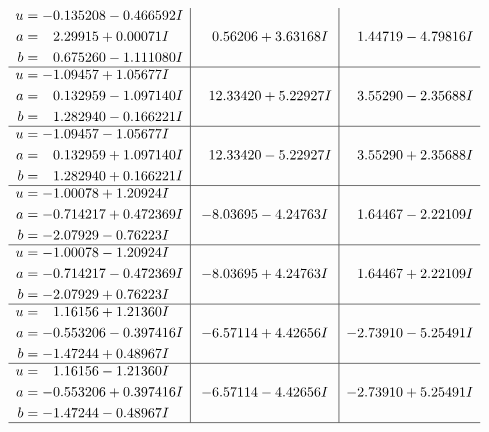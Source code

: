 \documentclass[1p]{elsarticle_modified}
\theoremstyle{definition}
\begin{document}
$$\begin{array}{c|c|c}
\begin{aligned}
u &= -0.135208 - 0.466592 I \\
a &= \phantom{-}2.29915 + 0.00071 I \\
b &= \phantom{-}0.675260 - 1.111080 I\end{aligned}
 & \phantom{-}0.56206 + 3.63168 I & \phantom{-}1.44719 - 4.79816 I \\ \hline\begin{aligned}
u &= -1.09457 + 1.05677 I \\
a &= \phantom{-}0.132959 - 1.097140 I \\
b &= \phantom{-}1.282940 - 0.166221 I\end{aligned}
 & \phantom{-}12.33420 + 5.22927 I & \phantom{-}3.55290 - 2.35688 I \\ \hline\begin{aligned}
u &= -1.09457 - 1.05677 I \\
a &= \phantom{-}0.132959 + 1.097140 I \\
b &= \phantom{-}1.282940 + 0.166221 I\end{aligned}
 & \phantom{-}12.33420 - 5.22927 I & \phantom{-}3.55290 + 2.35688 I \\ \hline\begin{aligned}
u &= -1.00078 + 1.20924 I \\
a &= -0.714217 + 0.472369 I \\
b &= -2.07929 - 0.76223 I\end{aligned}
 & -8.03695 - 4.24763 I & \phantom{-}1.64467 - 2.22109 I \\ \hline\begin{aligned}
u &= -1.00078 - 1.20924 I \\
a &= -0.714217 - 0.472369 I \\
b &= -2.07929 + 0.76223 I\end{aligned}
 & -8.03695 + 4.24763 I & \phantom{-}1.64467 + 2.22109 I \\ \hline\begin{aligned}
u &= \phantom{-}1.16156 + 1.21360 I \\
a &= -0.553206 - 0.397416 I \\
b &= -1.47244 + 0.48967 I\end{aligned}
 & -6.57114 + 4.42656 I & -2.73910 - 5.25491 I \\ \hline\begin{aligned}
u &= \phantom{-}1.16156 - 1.21360 I \\
a &= -0.553206 + 0.397416 I \\
b &= -1.47244 - 0.48967 I\end{aligned}
 & -6.57114 - 4.42656 I & -2.73910 + 5.25491 I\\
 \hline 
 \end{array}$$\newpage\newpage\renewcommand{\arraystretch}{1}
\end{document}
